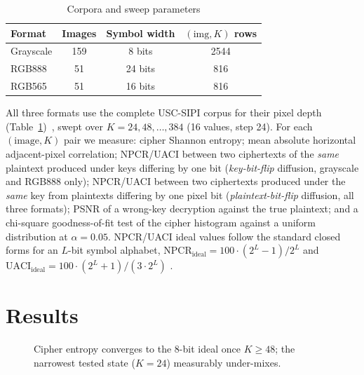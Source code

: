 \documentclass[conference]{IEEEtran}
\begin{document}
\begin{table}[htbp]
\centering
\small
\setlength{\tabcolsep}{4pt}
\caption{Corpora and sweep parameters}
\label{tab:setup}
\begin{tabular}{@{}lccc@{}}
\toprule
Format & Images & Symbol width & $(\text{img}, K)$ rows \\
\midrule
Grayscale & 159 & 8 bits  & 2544 \\
RGB888    & 51  & 24 bits & 816 \\
RGB565    & 51  & 16 bits & 816 \\
\bottomrule
\end{tabular}
\end{table}

All three formats use the complete USC-SIPI corpus for their pixel depth
(Table~\ref{tab:setup})~\cite{sipi}, swept over $K = 24, 48, \dots, 384$
(16 values, step 24). For each $(\text{image}, K)$ pair we measure: cipher
Shannon entropy; mean absolute horizontal adjacent-pixel correlation;
NPCR/UACI between two ciphertexts of the \emph{same} plaintext produced
under keys differing by one bit (\emph{key-bit-flip} diffusion, grayscale
and RGB888 only); NPCR/UACI between two ciphertexts produced under the
\emph{same} key from plaintexts differing by one pixel bit
(\emph{plaintext-bit-flip} diffusion, all three formats); PSNR of a
wrong-key decryption against the true plaintext; and a chi-square
goodness-of-fit test of the cipher histogram against a uniform
distribution at $\alpha = 0.05$. NPCR/UACI ideal values follow the
standard closed forms for an $L$-bit symbol alphabet,
$\mathrm{NPCR}_{\text{ideal}} = 100 \cdot (2^L{-}1)/2^L$ and
$\mathrm{UACI}_{\text{ideal}} = 100 \cdot (2^L{+}1)/(3 \cdot 2^L)$
\cite{wu2011npcr}.

\section{Results}
\label{sec:results}

\begin{figure}[htbp]
\centering
{}
\caption{Cipher entropy converges to the 8-bit ideal once $K \geq 48$; the
narrowest tested state ($K=24$) measurably under-mixes.}
\label{fig:entropy}
\end{figure}
\end{document}
